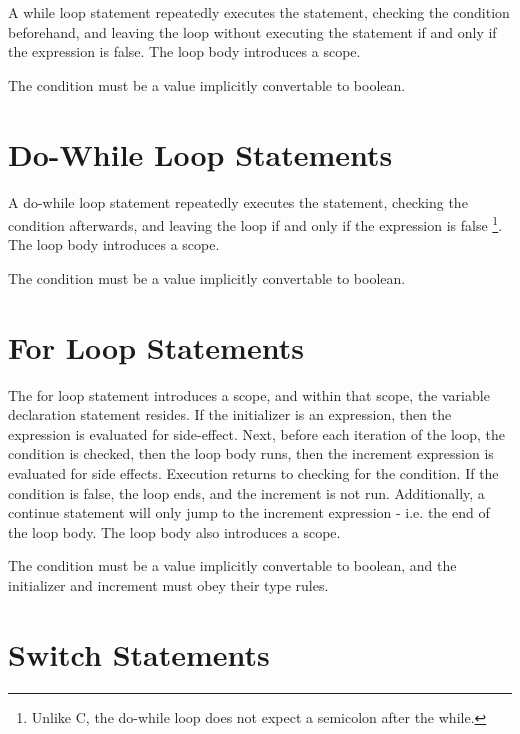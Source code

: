 \documentclass[letterpaper,12pt]{book}
\begin{document}


A while loop statement repeatedly executes the statement, checking the condition beforehand, and leaving the loop without executing the statement if and only if the expression is false. The loop body introduces a scope.

The condition must be a value implicitly convertable to boolean.

\section{Do-While Loop Statements}



A do-while loop statement repeatedly executes the statement, checking the condition afterwards, and leaving the loop if and only if the expression is false
\footnote{Unlike C, the do-while loop does not expect a semicolon after the while.}. The loop body introduces a scope.

The condition must be a value implicitly convertable to boolean.

\section{For Loop Statements}



The for loop statement introduces a scope, and within that scope, the variable declaration statement resides. If the initializer is an expression, then the expression is evaluated for side-effect. Next, before each iteration of the loop, the condition is checked, then the loop body runs, then the increment expression is evaluated for side effects. Execution returns to checking for the condition. If the condition is false, the loop ends, and the increment is not run. Additionally, a continue statement will only jump to the increment expression - i.e. the end of the loop body. The loop body also introduces a scope.

The condition must be a value implicitly convertable to boolean, and the initializer and increment must obey their type rules.

\section{Switch Statements}
\end{document}
